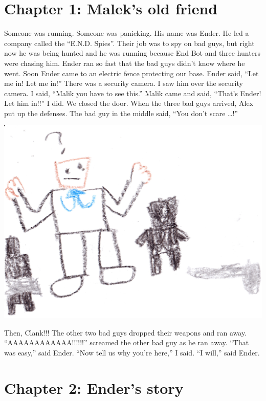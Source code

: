 \documentclass[12pt,oneside]{krantz}
\begin{document}
\hypertarget{chapter-1-maleks-old-friend}{%
\chapter*{Chapter 1: Malek's old
friend}\label{chapter-1-maleks-old-friend}}


Someone was running. Someone was panicking. His name was Ender. He led a
company called the ``E.N.D. Spies''. Their job was to spy on bad guys,
but right now he was being hunted and he was running because End Bot and
three hunters were chasing him. Ender ran so fast that the bad guys
didn't know where he went. Soon Ender came to an electric fence
protecting our base. Ender said, ``Let me in! Let me in!'' There was a
security camera. I saw him over the security camera. I said, ``Malik you
have to see this.'' Malik came and said, ``That's Ender! Let him in!!''
I did. We closed the door. When the three bad guys arrived, Alex put up
the defenses. The bad guy in the middle said, ``You don't scare
\ldots{}!''

\includegraphics[width=6.25in,height=\textheight]{img/scared.jpg}

Then, Clank!!! The other two bad guys dropped their weapons and ran
away. ``AAAAAAAAAAAA!!!!!!'' screamed the other bad guy as he ran away.
``That was easy,'' said Ender. ``Now tell us why you're here,'' I said.
``I will,'' said Ender.

\hypertarget{chapter-2-enders-story}{%
\chapter*{Chapter 2: Ender's story}\label{chapter-2-enders-story}}
\end{document}
